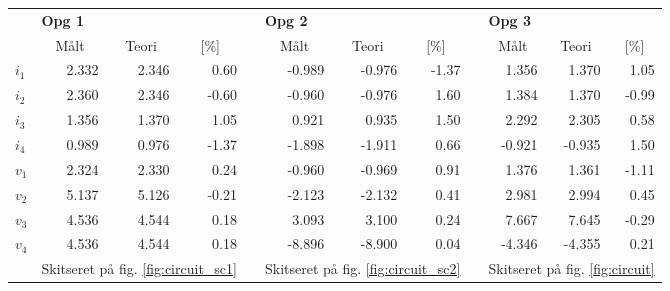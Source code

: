 \begin{table}[h]
\begin{adjustwidth}{-0.5cm}{-0.1cm}
\begin{tabular}{lrrrcrrrcrrr}
& \multicolumn{3}{l}{\textbf{Opg 1}}
&
& \multicolumn{3}{l}{\textbf{Opg 2}}
&
& \multicolumn{3}{l}{\textbf{Opg 3}} \\

& \multicolumn{1}{c}{Målt} 
& \multicolumn{1}{c}{Teori} 
& \multicolumn{1}{c}{[\%]} 
&
& \multicolumn{1}{c}{Målt} 
& \multicolumn{1}{c}{Teori} 
& \multicolumn{1}{c}{[\%]} 
&
& \multicolumn{1}{c}{Målt} 
& \multicolumn{1}{c}{Teori} 
& \multicolumn{1}{c}{[\%]} \\
\cmidrule(r){2-4} \cmidrule(r){6-8} \cmidrule(r){10-12}


\textbf{$i_1$} & 2.332 & 2.346 &  0.60 && -0.989 & -0.976 & -1.37 &&  1.356 &  1.370 &  1.05 \\ 
\textbf{$i_2$} & 2.360 & 2.346 & -0.60 && -0.960 & -0.976 &  1.60 &&  1.384 &  1.370 & -0.99 \\ 
\textbf{$i_3$} & 1.356 & 1.370 &  1.05 &&  0.921 &  0.935 &  1.50 &&  2.292 &  2.305 &  0.58 \\ 
\textbf{$i_4$} & 0.989 & 0.976 & -1.37 && -1.898 & -1.911 &  0.66 && -0.921 & -0.935 &  1.50 \\ \addlinespace
\textbf{$v_1$} & 2.324 & 2.330 &  0.24 && -0.960 & -0.969 &  0.91 &&  1.376 &  1.361 & -1.11 \\ 
\textbf{$v_2$} & 5.137 & 5.126 & -0.21 && -2.123 & -2.132 &  0.41 &&  2.981 &  2.994 &  0.45 \\ 
\textbf{$v_3$} & 4.536 & 4.544 &  0.18 &&  3.093 &  3.100 &  0.24 &&  7.667 &  7.645 & -0.29 \\ 
\textbf{$v_4$} & 4.536 & 4.544 &  0.18 && -8.896 & -8.900 &  0.04 && -4.346 & -4.355 &  0.21 \\ 
& \multicolumn{3}{l}{Skitseret på fig. \ref{fig:circuit_sc1}} && \multicolumn{3}{l}{Skitseret på fig. \ref{fig:circuit_sc2}} && \multicolumn{3}{l}{Skitseret på fig. \ref{fig:circuit}}\\
\end{tabular}
\end{adjustwidth}
\end{table}